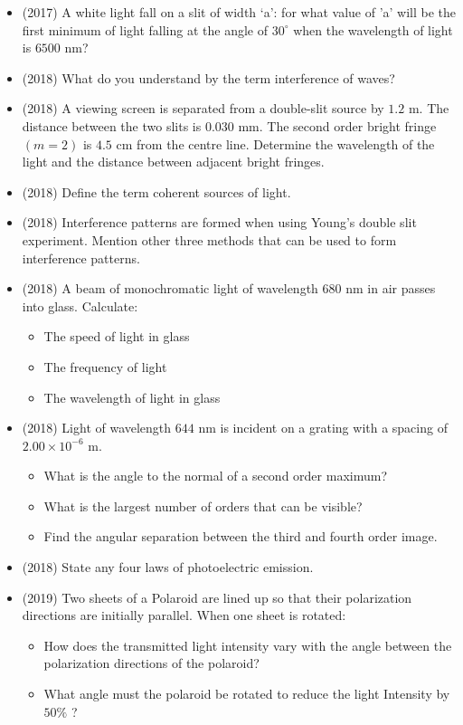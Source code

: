 \documentclass{article}
\begin{document}
\begin{itemize}
\item (2017)  A white light fall on a slit of width ‘a’: for what value of 'a' will be the first minimum of light falling at the angle of $ 30^{\circ}$ when the wavelength of light is $ 6500$ nm? 
\item (2018)  What do you understand by the term interference of waves?
\item (2018)  A viewing screen is separated from a double-slit source by $ 1.2$ m. The distance between the two slits is $ 0.030$ mm. The second order bright fringe $ (m=2)$ is $ 4.5$ cm from the centre line. Determine the wavelength of the light and the distance between adjacent bright fringes. 
\item (2018)  Define the term coherent sources of light. 
\item (2018)  Interference patterns are formed when using Young’s double slit experiment. Mention other three methods that can be used to form interference patterns. 
\item (2018)  A beam of monochromatic light of wavelength $ 680$ nm in air passes into glass.  Calculate: \begin{itemize}
\item The speed of light in glass
\item The frequency of light
\item The wavelength of light in glass
\end{itemize}
\item (2018)  Light of wavelength $ 644$ nm is incident on a grating with a spacing of $ 2.00 \times 10^{-6}$ m. \begin{itemize}
\item What is the angle to the normal of a second order maximum? 
\item What is the largest number of orders that can be visible? 
\item Find the angular separation between the third and fourth order image.
\end{itemize}
\item (2018)  State any four laws of photoelectric emission. 
\item (2019)  Two sheets of a Polaroid are lined up so that their polarization directions are initially parallel. When one sheet is rotated:\begin{itemize}
\item How does the transmitted light intensity vary with the angle between the polarization directions of the polaroid? 
\item What angle must the polaroid be rotated to reduce the light Intensity by $ 50\%$ ?

\end{itemize}
\end{itemize}
\end{document}
